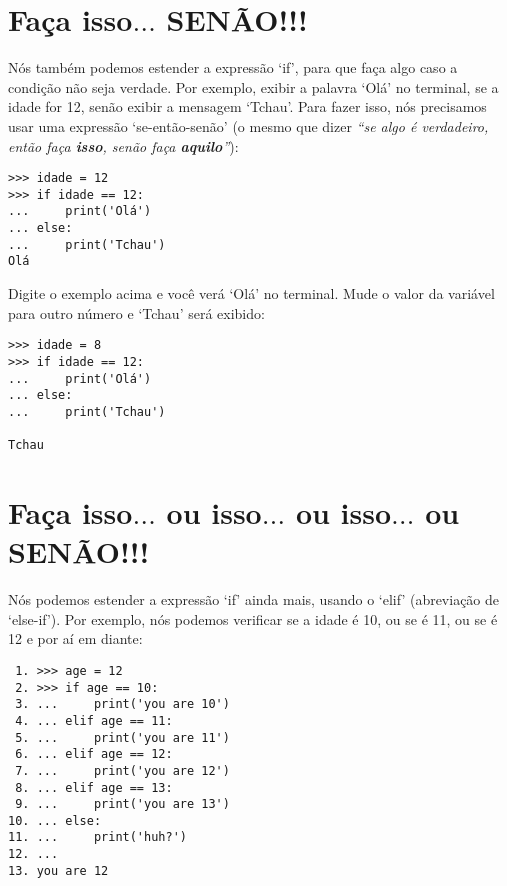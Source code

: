 \section{Faça isso$\ldots$ SENÃO!!!}

Nós também podemos estender a expressão `if', para que faça algo caso a condição não seja verdade. Por exemplo, exibir a palavra `Olá' no terminal, se a idade for 12, senão exibir a mensagem `Tchau'. Para fazer isso, nós precisamos usar uma expressão `se-então-senão' (o mesmo que dizer \emph{``se algo é verdadeiro, então faça \textbf{isso}, senão faça \textbf{aquilo}''}):

\begin{listing}
\begin{verbatim}
>>> idade = 12
>>> if idade == 12:
...     print('Olá')
... else:
...     print('Tchau')
Olá
\end{verbatim}
\end{listing}

Digite o exemplo acima e você verá `Olá' no terminal. Mude o valor da variável  para outro número e `Tchau' será exibido:

\begin{listing}
\begin{verbatim}
>>> idade = 8
>>> if idade == 12:
...     print('Olá')
... else:
...     print('Tchau')

Tchau
\end{verbatim}
\end{listing}

\section{Faça isso$\ldots$ ou isso$\ldots$ ou isso$\ldots$ ou SENÃO!!!}

Nós podemos estender a expressão `if' ainda mais, usando o `elif' (abreviação de `else-if'). Por exemplo, nós podemos verificar se a idade é 10, ou se é 11, ou se é 12 e por aí em diante:

\begin{listing}
\begin{verbatim}
 1. >>> age = 12
 2. >>> if age == 10:
 3. ...     print('you are 10')
 4. ... elif age == 11:
 5. ...     print('you are 11')
 6. ... elif age == 12:
 7. ...     print('you are 12')
 8. ... elif age == 13:
 9. ...     print('you are 13')
10. ... else:
11. ...     print('huh?')
12. ...
13. you are 12
\end{verbatim}
\end{listing}

